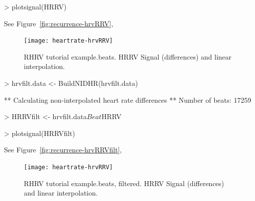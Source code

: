 \documentclass[a4paper, english, utf8]{amsart}
\newcommand{\figref}[1]{Figure\ \vref{#1}}
\begin{document}
\begin{Schunk}
\begin{Sinput}
> plotsignal(HRRV)
\end{Sinput}
\end{Schunk}
See \figref{fig:recurrence-hrvRRV},

\begin{figure}[htbp]
\begin{center}
\texttt{[image: heartrate-hrvRRV]}
\caption{RHRV tutorial example.beats. HRRV Signal (differences) and linear interpolation.}
\label{fig:recurrence-hrvRRV}
\end{center}
\end{figure}

%
\begin{Schunk}
\begin{Sinput}
> hrvfilt.data <- BuildNIDHR(hrvfilt.data)
\end{Sinput}
\begin{Soutput}
** Calculating non-interpolated heart rate differences **
   Number of beats: 17259 
\end{Soutput}
\begin{Sinput}
> HRRVfilt <- hrvfilt.data$Beat$HRRV
\end{Sinput}
\end{Schunk}


\begin{Schunk}
\begin{Sinput}
> plotsignal(HRRVfilt)
\end{Sinput}
\end{Schunk}
See \figref{fig:recurrence-hrvRRVfilt},

\begin{figure}[htbp]
\begin{center}
\texttt{[image: heartrate-hrvRRV]}
\caption{RHRV tutorial example.beats, filtered.  HRRV Signal (differences) and linear interpolation.}
\label{fig:recurrence-hrvRRVfilt}
\end{center}
\end{figure}
\end{document}
